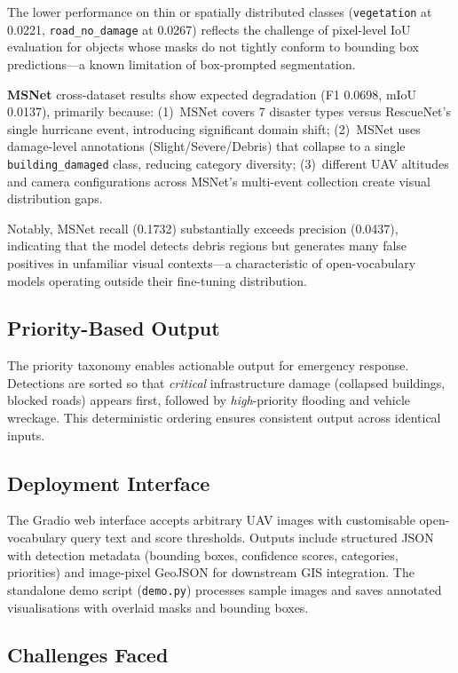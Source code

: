 \documentclass[10pt,a4paper,twocolumn]{article}
\begin{document}
The lower performance on thin or spatially distributed classes (\texttt{vegetation} at 0.0221, \texttt{road\_no\_damage} at 0.0267) reflects the challenge of pixel-level IoU evaluation for objects whose masks do not tightly conform to bounding box predictions---a known limitation of box-prompted segmentation.

\textbf{MSNet} cross-dataset results show expected degradation (F1 0.0698, mIoU 0.0137), primarily because: (1)~MSNet covers 7 disaster types versus RescueNet's single hurricane event, introducing significant domain shift; (2)~MSNet uses damage-level annotations (Slight/Severe/Debris) that collapse to a single \texttt{building\_damaged} class, reducing category diversity; (3)~different UAV altitudes and camera configurations across MSNet's multi-event collection create visual distribution gaps.

Notably, MSNet recall (0.1732) substantially exceeds precision (0.0437), indicating that the model detects debris regions but generates many false positives in unfamiliar visual contexts---a characteristic of open-vocabulary models operating outside their fine-tuning distribution.

\subsection{Priority-Based Output}

The priority taxonomy enables actionable output for emergency response. Detections are sorted so that \textit{critical} infrastructure damage (collapsed buildings, blocked roads) appears first, followed by \textit{high}-priority flooding and vehicle wreckage. This deterministic ordering ensures consistent output across identical inputs.

\subsection{Deployment Interface}

The Gradio web interface accepts arbitrary UAV images with customisable open-vocabulary query text and score thresholds. Outputs include structured JSON with detection metadata (bounding boxes, confidence scores, categories, priorities) and image-pixel GeoJSON for downstream GIS integration. The standalone demo script (\texttt{demo.py}) processes sample images and saves annotated visualisations with overlaid masks and bounding boxes.

\subsection{Challenges Faced}
\end{document}
